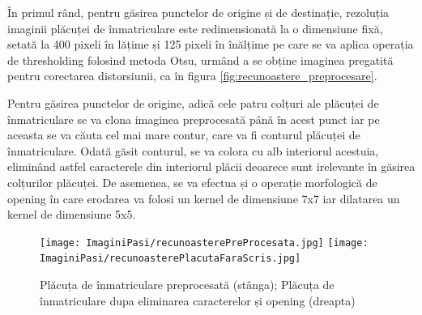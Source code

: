 \documentclass[12pt]{article}
\begin{document}
\^{I}n primul r\^{a}nd, pentru g\u{a}sirea punctelor de origine și de destinație, rezoluția imaginii pl\u{a}cuței de \^{i}nmatriculare este redimensionat\u{a} la o dimensiune fix\u{a}, setat\u{a} la 400 pixeli \^{i}n l\u{a}țime și 125 pixeli \^{i}n \^{i}n\u{a}lțime pe care se va aplica operația de thresholding folosind metoda Otsu, urm\^{a}nd a se obține imaginea pregatit\u{a} pentru corectarea distorsiunii, ca \^{i}n figura \ref{fig:recunoastere_preprocesare}.

Pentru g\u{a}sirea punctelor de origine, adic\u{a} cele patru colțuri ale pl\u{a}cuței de \^{i}nmatriculare se va clona imaginea preprocesat\u{a} p\^{a}n\u{a} \^{i}n acest punct iar pe aceasta se va c\u{a}uta cel mai mare contur, care va fi conturul pl\u{a}cuței de \^{i}nmatriculare. Odat\u{a} g\u{a}sit conturul, se va colora cu alb interiorul acestuia, elimin\^{a}nd astfel caracterele din interiorul pl\u{a}cii deoarece sunt irelevante \^{i}n g\u{a}sirea colțurilor pl\u{a}cuței. De asemenea, se va efectua și o operație morfologic\u{a} de opening \^{i}n care erodarea va folosi un kernel de dimensiune 7x7 iar dilatarea un kernel de dimensiune 5x5.

\begin{figure}[H]
  \centering
  \texttt{[image: ImaginiPasi/recunoasterePreProcesata.jpg]}\hfill
    \texttt{[image: ImaginiPasi/recunoasterePlacutaFaraScris.jpg]}
  \caption{Pl\u{a}cuța de \^{i}nmatriculare preprocesat\u{a} (st\^{a}nga); Pl\u{a}cuța de \^{i}nmatriculare dupa eliminarea caracterelor și opening (dreapta)}
  \label{fig:recunoastere_clona}
\end{figure}
\end{document}
